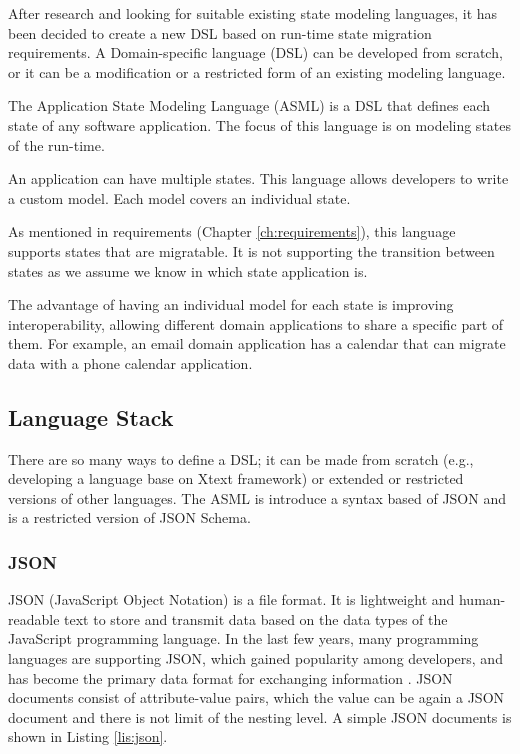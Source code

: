After research and looking for suitable existing state modeling languages, it has been decided to create a new DSL based on run-time state migration requirements. A Domain-specific language (DSL) can be developed from scratch, or it can be a modification or a restricted form of an existing modeling language.

The Application State Modeling Language (ASML) is a DSL that defines each state of any software application. The focus of this language is on modeling states of the run-time.

An application can have multiple states. This language allows developers to write a custom model. Each model covers an individual state. 

As mentioned in requirements (Chapter \ref{ch:requirements}), this language supports states that are migratable. It is not supporting the transition between states as we assume we know in which state application is.

The advantage of having an individual model for each state is improving interoperability, allowing different domain applications to share a specific part of them. For example, an email domain application has a calendar that can migrate data with a phone calendar application.


\subsection{Language Stack}
There are so many ways to define a DSL; it can be made from scratch (e.g., developing a language base on Xtext framework) or extended or restricted versions of other languages. The ASML is introduce a syntax based of JSON and is a restricted version of JSON Schema.

\subsubsection{JSON}
JSON (JavaScript Object Notation) is a file format. It is lightweight and human-readable text to store and transmit data based on the data types of the JavaScript programming language. In the last few years, many programming languages are supporting JSON, which gained popularity among developers, and has become the primary data format for exchanging information \cite{json-schema}. JSON documents consist of attribute-value pairs, which the value can be again a JSON document and there is not limit of the nesting level. A simple JSON documents is shown in Listing \ref{lis:json}.

